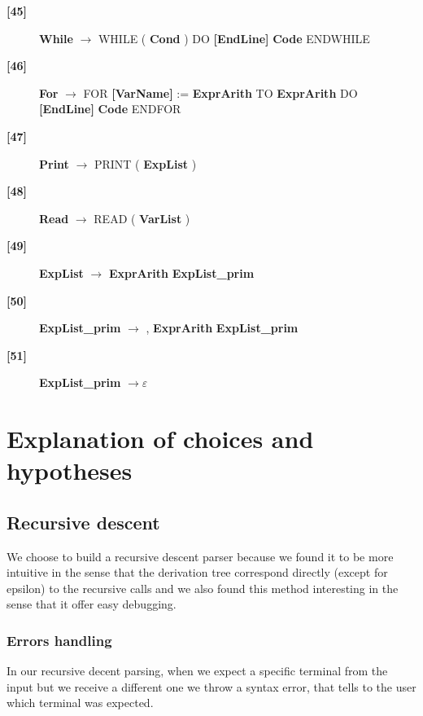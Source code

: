 \documentclass[12pt]{article}
\begin{document}
\begin{description}
	\item[\textbf{[45]}]{ \textbf{\textlangle{}While\textrangle{}}  $\rightarrow$ WHILE ( \textbf{\textlangle{}Cond\textrangle{}}  ) DO \textbf{[EndLine]} \textbf{\textlangle{}Code\textrangle{}}  ENDWHILE}
	\item[\textbf{[46]}]{ \textbf{\textlangle{}For\textrangle{}}  $\rightarrow$ FOR \textbf{[VarName]} := \textbf{\textlangle{}ExprArith\textrangle{}}  TO \textbf{\textlangle{}ExprArith\textrangle{}}  DO \textbf{[EndLine]} \textbf{\textlangle{}Code\textrangle{}}  ENDFOR}
	\item[\textbf{[47]}]{ \textbf{\textlangle{}Print\textrangle{}}  $\rightarrow$ PRINT ( \textbf{\textlangle{}ExpList\textrangle{}}  )}
	\item[\textbf{[48]}]{ \textbf{\textlangle{}Read\textrangle{}}  $\rightarrow$ READ ( \textbf{\textlangle{}VarList\textrangle{}}  )}
	\item[\textbf{[49]}]{ \textbf{\textlangle{}ExpList\textrangle{}}  $\rightarrow$ \textbf{\textlangle{}ExprArith\textrangle{}}  \textbf{\textlangle{}ExpList\_prim\textrangle{}} }
	\item[\textbf{[50]}]{ \textbf{\textlangle{}ExpList\_prim\textrangle{}}  $\rightarrow$ , \textbf{\textlangle{}ExprArith\textrangle{}}  \textbf{\textlangle{}ExpList\_prim\textrangle{}} }
	\item[\textbf{[51]}]{ \textbf{\textlangle{}ExpList\_prim\textrangle{}}  $\rightarrow \varepsilon$}

\end{description}

\section{Explanation of choices and hypotheses}

\subsection{Recursive descent}
We choose to build a recursive descent parser because we found it to be more intuitive in the sense
that the derivation tree correspond directly (except for epsilon) to the recursive calls and we also
found this method interesting in the sense that it offer easy debugging.

\subsubsection{Errors handling}
In our recursive decent parsing, when we expect a specific terminal from the input but
we receive a different one we throw a syntax error, that tells to the user which terminal was expected.
\end{document}
